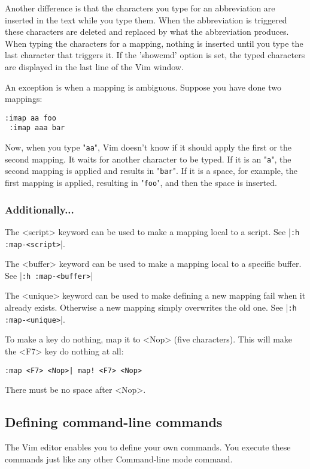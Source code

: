 {Another difference is that the characters you type for an abbreviation are inserted in the text while you type them.
When the abbreviation is triggered these characters are deleted and replaced by what the abbreviation produces.
When typing the characters for a mapping, nothing is inserted until you type the last character that triggers it.
If the 'showcmd' option is set, the typed characters are displayed in the last line of the Vim window.

An exception is when a mapping is ambiguous.
Suppose you have done two mappings:

\begin{Verbatim}[samepage=true]
 :imap aa foo
 :imap aaa bar
\end{Verbatim}

Now, when you type "\verb!aa!", Vim doesn't know if it should apply the first or the second mapping.
It waits for another character to be typed.
If it is an "\verb!a!", the second mapping is applied and results in "\verb!bar!".
If it is a space, for example, the first mapping is applied, resulting in "\verb!foo!", and then the space is inserted.

\subsubsection{Additionally...}
The <script> keyword can be used to make a mapping local to a script.
See |\verb!:h :map-<script>!|.

The <buffer> keyword can be used to make a mapping local to a specific buffer.
See |\verb!:h :map-<buffer>!|

The <unique> keyword can be used to make defining a new mapping fail when it already exists.
Otherwise a new mapping simply overwrites the old one.
See |\verb!:h :map-<unique>!|.

To make a key do nothing, map it to <Nop> (five characters).
This will make the <F7> key do nothing at all:

\begin{Verbatim}[samepage=true]
 :map <F7> <Nop>| map! <F7> <Nop>
\end{Verbatim}

There must be no space after <Nop>.
\subsection{Defining command-line commands}
The Vim editor enables you to define your own commands.
You execute these commands just like any other Command-line mode command.

}
